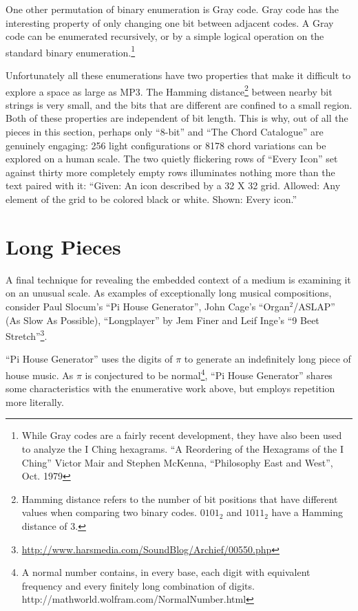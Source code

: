 \documentclass{thesis}
\begin{document}
One other permutation of binary enumeration is Gray code. Gray code has the interesting property of only changing one bit between adjacent codes. A Gray code can be enumerated recursively, or by a simple logical operation on the standard binary enumeration.\footnote{While Gray codes are a fairly recent development, they have also been used to analyze the I Ching hexagrams. ``A Reordering of the Hexagrams of the I Ching'' Victor Mair and Stephen McKenna, ``Philosophy East and West'', Oct. 1979}

Unfortunately all these enumerations have two properties that make it difficult to explore a space as large as MP3. The Hamming distance\footnote{Hamming distance refers to the number of bit positions that have different values when comparing two binary codes. $0101_2$ and $1011_2$ have a Hamming distance of 3.} between nearby bit strings is very small, and the bits that are different are confined to a small region. Both of these properties are independent of bit length. This is why, out of all the pieces in this section, perhaps only ``8-bit'' and ``The Chord Catalogue'' are genuinely engaging: 256 light configurations or 8178 chord variations can be explored on a human scale. The two quietly flickering rows of ``Every Icon'' set against thirty more completely empty rows illuminates nothing more than the text paired with it: ``Given: An icon described by a 32 X 32 grid. Allowed: Any element of the grid to be colored black or white. Shown: Every icon.''
		
\section{Long Pieces}

A final technique for revealing the embedded context of a medium is examining it on an unusual scale. As examples of exceptionally long musical compositions, consider Paul Slocum's ``Pi House Generator''\cite{paul_slocum_pi_2007}, John Cage's ``Organ$^2$/ASLAP'' (As Slow As Possible)\cite{john_cage_as_????}, ``Longplayer'' by Jem Finer\cite{jem_finer_longplayer_????} and Leif Inge's ``9 Beet Stretch''\footnote{\url{http://www.harsmedia.com/SoundBlog/Archief/00550.php}}.

``Pi House Generator'' uses the digits of $\pi$ to generate an indefinitely long piece of house music. As $\pi$ is conjectured to be normal\footnote{A normal number contains, in every base, each digit with equivalent frequency and every finitely long combination of digits. http://mathworld.wolfram.com/NormalNumber.html}, ``Pi House Generator'' shares some characteristics with the enumerative work above, but employs repetition more literally.
\end{document}
